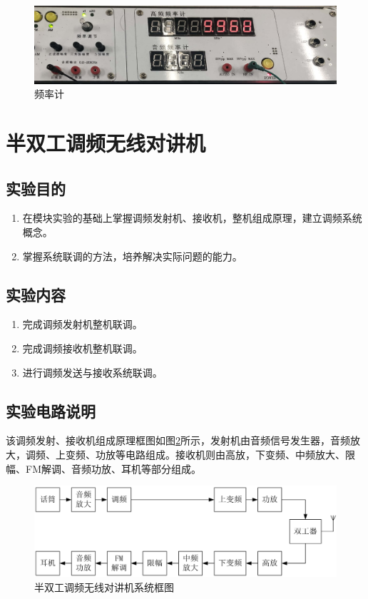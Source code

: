 \documentclass[12pt]{article}%
\numberwithin{equation}{section}
\begin{document}
\begin{enumerate}
\begin{figure}[htbp]
   \includegraphics[width=\textwidth]{gaopin5/gaopin503.jpg} 
  \caption{频率计 } 
  \label{fig:plj} 
\end{figure}
\end{enumerate}

\section{半双工调频无线对讲机}
\setcounter{equation}{0}
\setcounter{table}{0}
\setcounter{figure}{0}
\subsection{实验目的}
\begin{enumerate}\addtolength{\itemsep}{-1.5ex}
\item 在模块实验的基础上掌握调频发射机、接收机，整机组成原理，建立调频系统概念。
\item 掌握系统联调的方法，培养解决实际问题的能力。
\end{enumerate}
\subsection{实验内容}
\begin{enumerate}\addtolength{\itemsep}{-1.5ex}
\item 完成调频发射机整机联调。
\item 完成调频接收机整机联调。
\item 进行调频发送与接收系统联调。
\end{enumerate}
\subsection{实验电路说明}
该调频发射、接收机组成原理框图如图\ref{img:FM}所示，发射机由音频信号发生器，音频放大，调频、上变频、功放等电路组成。接收机则由高放，下变频、中频放大、限幅、FM解调、音频功放、耳机等部分组成。
       \begin{figure}[htbp]
  \centering
  \includegraphics[width=\textwidth]{image003.png} 
  \caption{ 半双工调频无线对讲机系统框图} 
  \label{img:FM} 
\end{figure}
\end{document}
